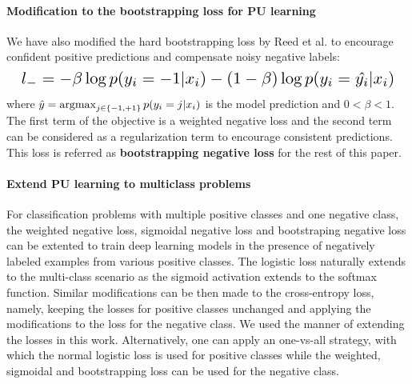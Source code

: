 \paragraph{Modification to the bootstrapping loss for PU learning}
\noindent
We have also modified the hard bootstrapping loss by Reed et al.\cite{reed2014training} to encourage confident positive predictions and compensate noisy negative labels:
\begin{equation*}
  \resizebox{\columnwidth}{!}{
    $l_{-} = - \beta \log p(y_i=-1 \vert x_i) - (1-\beta) \log p(y_i=\hat{y_i} \vert x_i)$
    }
\end{equation*}
where $\hat{y} = \operatorname*{argmax}_{j\in\{-1,+1\}}{p(y_i=j \vert x_i)}$ is the model prediction and $0<\beta<1$.
The first term of the objective is a weighted negative loss and the second term can be considered as a regularization term to encourage consistent predictions.
This loss is referred as \textbf{bootstrapping negative loss} for the rest of this paper.

\paragraph{Extend PU learning to multiclass problems}
For classification problems with multiple positive classes and one negative class, the weighted negative loss, sigmoidal negative loss and bootstraping negative loss can be extented to train deep learning models in the presence of negatively labeled examples from various positive classes.
The logistic loss naturally extends to the multi-class scenario as the sigmoid activation extends to the softmax function.
Similar modifications can be then made to the cross-entropy loss, namely, keeping the losses for positive classes unchanged and applying the modifications to the loss for the negative class.
We used the manner of extending the losses in this work.
Alternatively, one can apply an one-vs-all strategy, with which the normal logistic loss is used for positive classes while the weighted, sigmoidal and bootstrapping loss can be used for the negative class.

